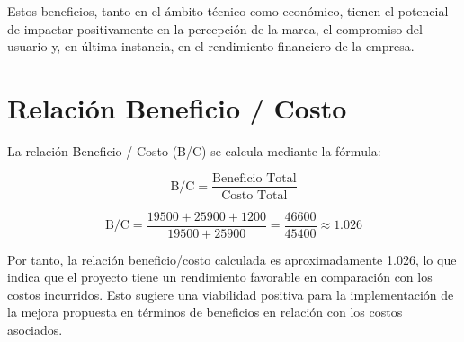 Estos beneficios, tanto en el ámbito técnico como económico, tienen el potencial de impactar positivamente en la percepción de la marca, el compromiso del usuario y, en última instancia, en el rendimiento financiero de la empresa.

\section{Relación Beneficio / Costo}

\cite{perez2023metodos} La relación Beneficio / Costo (B/C) se calcula mediante la fórmula:

\[
\text{B/C} = \frac{\text{Beneficio Total}}{\text{Costo Total}}
\]

\[
\text{B/C} = \frac{{19500 + 25900 + 1200}}{{19500 + 25900}} = \frac{46600}{45400} \approx 1.026
\]

Por tanto, la relación beneficio/costo calculada es aproximadamente 1.026, lo que indica que el proyecto tiene un rendimiento favorable en comparación con los costos incurridos. Esto sugiere una viabilidad positiva para la implementación de la mejora propuesta en términos de beneficios en relación con los costos asociados.

